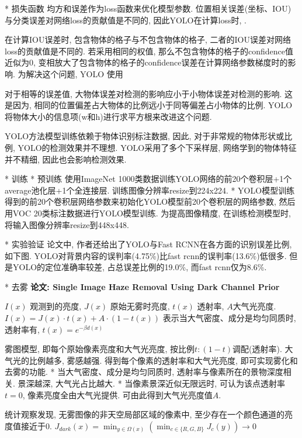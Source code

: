{				* 损失函数
					均方和误差作为loss函数来优化模型参数. 位置相关误差(坐标、IOU)与分类误差对网络loss的贡献值是不同的, 因此YOLO在计算loss时, .

					在计算IOU误差时, 包含物体的格子与不包含物体的格子, 二者的IOU误差对网络loss的贡献值是不同的. 若采用相同的权值, 那么不包含物体的格子的confidence值近似为0, 变相放大了包含物体的格子的confidence误差在计算网络参数梯度时的影响. 为解决这个问题, YOLO 使用

					对于相等的误差值, 大物体误差对检测的影响应小于小物体误差对检测的影响. 这是因为, 相同的位置偏差占大物体的比例远小于同等偏差占小物体的比例. YOLO将物体大小的信息项(w和h)进行求平方根来改进这个问题. 

					YOLO方法模型训练依赖于物体识别标注数据, 因此, 对于非常规的物体形状或比例, YOLO的检测效果并不理想. YOLO采用了多个下采样层, 网络学到的物体特征并不精细, 因此也会影响检测效果. 

			* 训练
				* 预训练
					使用ImageNet 1000类数据训练YOLO网络的前20个卷积层+1个average池化层+1个全连接层. 训练图像分辨率resize到224x224. 
				* YOLO模型训练
					得到的前20个卷积层网络参数来初始化YOLO模型前20个卷积层的网络参数, 然后用VOC 20类标注数据进行YOLO模型训练. 为提高图像精度, 在训练检测模型时, 将输入图像分辨率resize到448x448. 

			* 实验验证
				论文中, 作者还给出了YOLO与Fast RCNN在各方面的识别误差比例, 如下图. YOLO对背景内容的误判率(4.75\%)比fast rcnn的误判率(13.6\%)低很多. 但是YOLO的定位准确率较差, 占总误差比例的19.0\%, 而fast rcnn仅为8.6\%. 

	* 去雾
		\bf{论文}: Single Image Haze Removal Using Dark Channel Prior

			$I(x)$ 观测到的亮度, $J(x)$ 原始无雾时亮度, $t(x)$ 透射率, $A$大气光亮度.
			$I(x) = J(x) · t(x) + A · (1 - t(x))$
			表示当大气密度、成分是均匀同质时, 透射率有,
			$t(x) = e^{-\beta d(x)}$

			\Notes
				雾图模型, 即每个原始像素亮度和大气光亮度, 按比例$t : (1-t)$调配(透射率). 大气光的比例越多, 雾感越强. 得到每个像素的透射率和大气光亮度, 即可实现雾化和去雾的功能.
				* 当大气密度、成分是均匀同质时, 透射率与像素所在的景物深度相关. 景深越深, 大气光占比越大. 
				* 当像素景深近似无限远时, 可认为该点透射率$t = 0$, 像素亮度全由大气光提供. 可由此得到大气光亮度值$A$.

			统计观察发现, 无雾图像的非天空局部区域的像素中, 至少存在一个颜色通道的亮度值接近于0.
			$J_{dark}(x) = \min_{y\in \Omega(x)} (\min_{c\in \{R,G,B\}} J_c(y)) \to 0$

}
